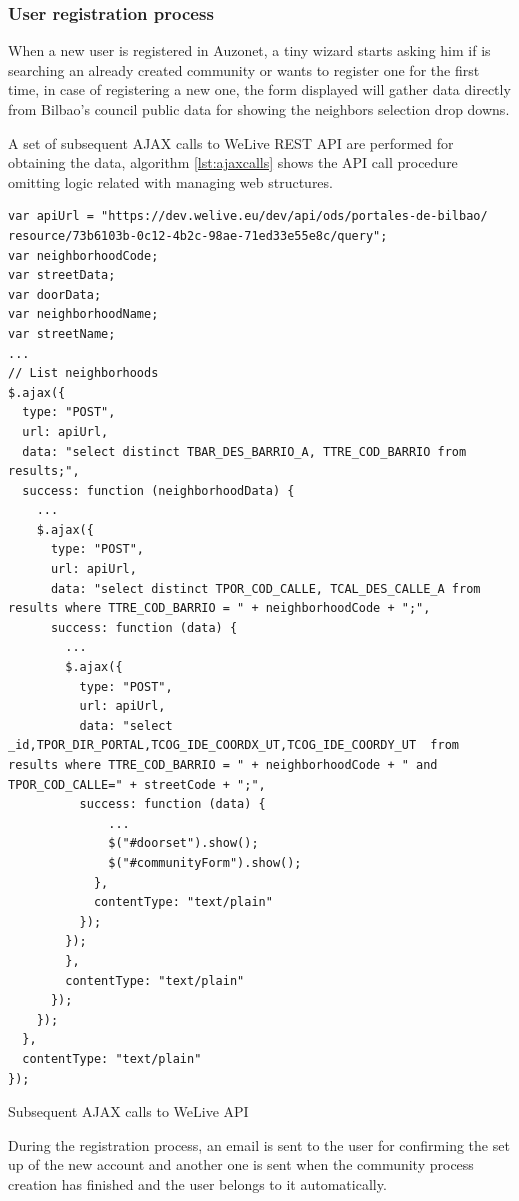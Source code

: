 \documentclass{DeustoFDP}
\begin{document}
\subsubsection{User registration process}
When a new user is registered in Auzonet, a tiny wizard starts asking him if is searching an already created community or wants to register one for the first time, in case of registering a new one, the form displayed will gather data directly from Bilbao's council public data for showing the neighbors selection drop downs.

A set of subsequent AJAX calls to WeLive REST API are performed for obtaining the data, algorithm \ref{lst:ajaxcalls} shows the API call procedure omitting logic related with managing web structures.

\begin{listing}[!h]\centering 
	\begin{minipage}{.9\textwidth}
		\begin{verbatim}
var apiUrl = "https://dev.welive.eu/dev/api/ods/portales-de-bilbao/
resource/73b6103b-0c12-4b2c-98ae-71ed33e55e8c/query";
var neighborhoodCode;
var streetData;
var doorData;
var neighborhoodName;
var streetName;
...
// List neighborhoods
$.ajax({
  type: "POST",
  url: apiUrl,
  data: "select distinct TBAR_DES_BARRIO_A, TTRE_COD_BARRIO from results;",
  success: function (neighborhoodData) {
    ...
    $.ajax({
      type: "POST",
      url: apiUrl,
      data: "select distinct TPOR_COD_CALLE, TCAL_DES_CALLE_A from results where TTRE_COD_BARRIO = " + neighborhoodCode + ";",
      success: function (data) {
        ...
        $.ajax({
          type: "POST",
          url: apiUrl,
          data: "select _id,TPOR_DIR_PORTAL,TCOG_IDE_COORDX_UT,TCOG_IDE_COORDY_UT  from results where TTRE_COD_BARRIO = " + neighborhoodCode + " and TPOR_COD_CALLE=" + streetCode + ";",
          success: function (data) {
              ...
              $("#doorset").show();
              $("#communityForm").show();
            },
            contentType: "text/plain"
          });
        });
        },
        contentType: "text/plain"
      });
    });
  },
  contentType: "text/plain"
});
		\end{verbatim}
	\end{minipage}
	\caption{Subsequent AJAX calls to WeLive API }\label{lst:ajaxcalls}
\end{listing}

During the registration process, an email is sent to the user for confirming the set up of the new account and another one is sent when the community process creation has finished and the user belongs to it automatically.
\end{document}
